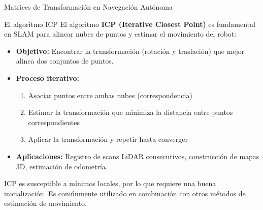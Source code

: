 \documentclass[10pt]{beamer}
\begin{document}
\begin{frame}{Matrices de Transformación en Navegación Autónoma}
\begin{center}
            \end{center}
        \end{frame}


        \begin{frame}{El algoritmo ICP}
            El algoritmo \textbf{ICP (Iterative Closest Point)} es fundamental en SLAM para alinear nubes de puntos y estimar el movimiento del robot:
            
            \begin{itemize}
                \item \textbf{Objetivo:} Encontrar la transformación (rotación y traslación) que mejor alinea dos conjuntos de puntos.
                
                \item \textbf{Proceso iterativo:}
                \begin{enumerate}
                    \item Asociar puntos entre ambas nubes (correspondencia)
                    \item Estimar la transformación que minimiza la distancia entre puntos correspondientes
                    \item Aplicar la transformación y repetir hasta converger
                \end{enumerate}
                
                \item \textbf{Aplicaciones:} Registro de scans LiDAR consecutivos, construcción de mapas 3D, estimación de odometría.
            \end{itemize}
            
            ICP es susceptible a mínimos locales, por lo que requiere una buena inicialización. Es comúnmente utilizado en combinación con otros métodos de estimación de movimiento.
        \end{frame}
	
\end{document}
